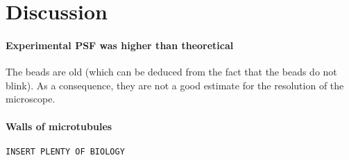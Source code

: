\section{Discussion}
\paragraph{Experimental PSF was higher than theoretical}
The beads are old (which can be deduced from the fact that the beads do not blink).
As a consequence, they are not a good estimate for the resolution of the microscope.

\paragraph{Walls of microtubules}
\verb|INSERT PLENTY OF BIOLOGY|